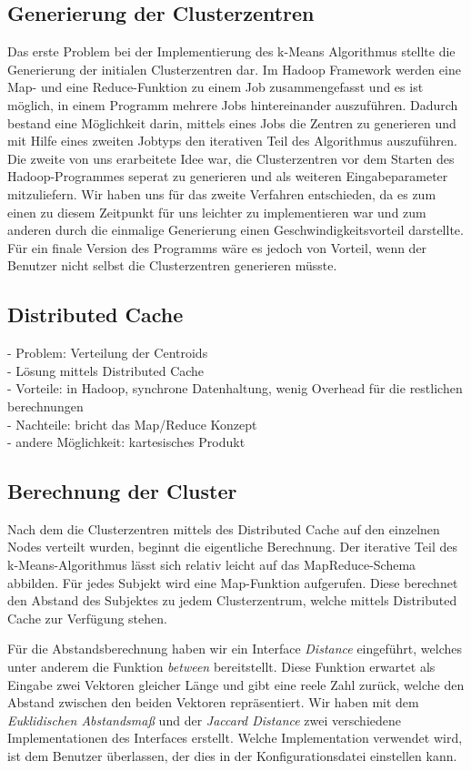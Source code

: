 \documentclass[a4paper]{llncs}
\begin{document}
\subsection{Generierung der Clusterzentren}
Das erste Problem bei der Implementierung des k-Means Algorithmus stellte die Generierung der initialen Clusterzentren dar. Im Hadoop Framework werden eine Map- und eine Reduce-Funktion zu einem Job zusammengefasst und es ist möglich, in einem Programm mehrere Jobs hintereinander auszuführen. Dadurch bestand eine Möglichkeit darin, mittels eines Jobs die Zentren zu generieren und mit Hilfe eines zweiten Jobtyps den iterativen Teil des Algorithmus auszuführen. Die zweite von uns erarbeitete Idee war, die Clusterzentren vor dem Starten des Hadoop-Programmes seperat zu generieren und als weiteren Eingabeparameter mitzuliefern. Wir haben uns für das zweite Verfahren entschieden, da es zum einen zu diesem Zeitpunkt für uns leichter zu implementieren war und zum anderen durch die einmalige Generierung einen Geschwindigkeitsvorteil darstellte. Für ein finale Version des Programms wäre es jedoch von Vorteil, wenn der Benutzer nicht selbst die Clusterzentren generieren müsste.

\subsection{Distributed Cache}
- Problem: Verteilung der Centroids\\
- Lösung mittels Distributed Cache\\
- Vorteile: in Hadoop, synchrone Datenhaltung, wenig Overhead für die restlichen berechnungen\\
- Nachteile: bricht das Map/Reduce Konzept\\
- andere Möglichkeit: kartesisches Produkt

\subsection{Berechnung der Cluster}
Nach dem die Clusterzentren mittels des Distributed Cache auf den einzelnen Nodes verteilt wurden, beginnt die eigentliche Berechnung.
Der iterative Teil des k-Means-Algorithmus lässt sich relativ leicht auf das MapReduce-Schema abbilden. Für jedes Subjekt wird eine Map-Funktion aufgerufen. 
Diese berechnet den Abstand des Subjektes zu jedem Clusterzentrum, welche mittels Distributed Cache zur Verfügung stehen.

Für die Abstandsberechnung haben wir ein Interface \emph{Distance} eingeführt, welches unter anderem die Funktion \emph{between} bereitstellt.
Diese Funktion erwartet als Eingabe zwei Vektoren gleicher Länge und gibt eine reele Zahl zurück, welche den Abstand zwischen den beiden Vektoren repräsentiert.
Wir haben mit dem \emph{Euklidischen Abstandsmaß} und der \emph{Jaccard Distance} zwei verschiedene Implementationen des Interfaces erstellt.
Welche Implementation verwendet wird, ist dem Benutzer überlassen, der dies in der Konfigurationsdatei einstellen kann.
\end{document}
